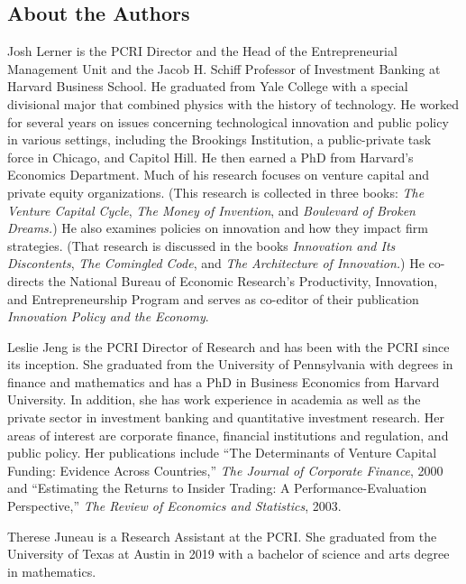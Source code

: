 \documentclass[
]{WileySix}
\begin{document}
\hypertarget{about-the-authors-3}{%
\subsection*{About the Authors}\label{about-the-authors-3}}

Josh Lerner is the PCRI Director and the Head of the Entrepreneurial Management Unit and the Jacob H. Schiff Professor of Investment Banking at Harvard Business School. He graduated from Yale College with a special divisional major that combined physics with the history of technology. He worked for several years on issues concerning technological innovation and public policy in various settings, including the Brookings Institution, a public-private task force in Chicago, and Capitol Hill. He then earned a PhD from Harvard's Economics Department. Much of his research focuses on venture capital and private equity organizations. (This research is collected in three books: \emph{The Venture Capital Cycle}, \emph{The Money of Invention}, and \emph{Boulevard of Broken Dreams.}) He also examines policies on innovation and how they impact firm strategies. (That research is discussed in the books \emph{Innovation and Its Discontents}, \emph{The Comingled Code}, and \emph{The Architecture of Innovation.}) He co-directs the National Bureau of Economic Research's Productivity, Innovation, and Entrepreneurship Program and serves as co-editor of their publication \emph{Innovation Policy and the Economy}.

Leslie Jeng is the PCRI Director of Research and has been with the PCRI since its inception. She graduated from the University of Pennsylvania with degrees in finance and mathematics and has a PhD in Business Economics from Harvard University. In addition, she has work experience in academia as well as the private sector in investment banking and quantitative investment research. Her areas of interest are corporate finance, financial institutions and regulation, and public policy. Her publications include ``The Determinants of Venture Capital Funding: Evidence Across Countries,'' \emph{The Journal of Corporate Finance}, 2000 and ``Estimating the Returns to Insider Trading: A Performance-Evaluation Perspective,'' \emph{The Review of Economics and Statistics}, 2003.

Therese Juneau is a Research Assistant at the PCRI. She graduated from the University of Texas at Austin in 2019 with a bachelor of science and arts degree in mathematics.
\end{document}
